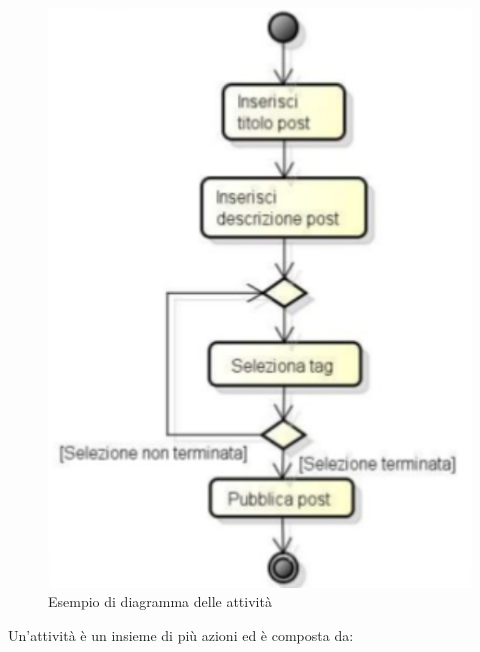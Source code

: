 \begin{figure}[H]
\centering
    \includegraphics[scale=0.5]{res/img/esempioDiagrammaAttivita}
    \caption{Esempio di diagramma delle attività}
\end{figure}
Un'attività è un insieme di più azioni ed è composta da:
